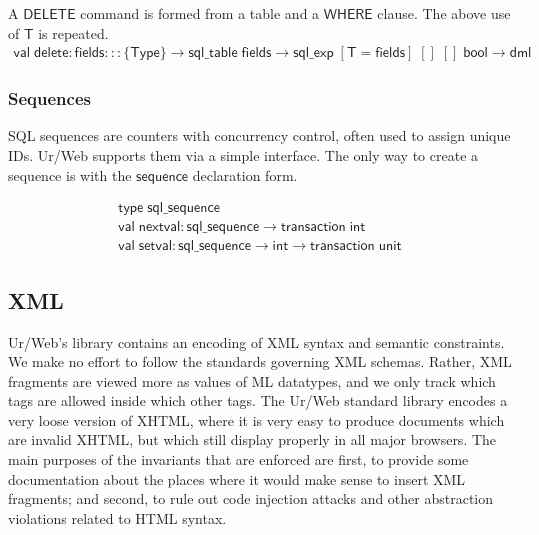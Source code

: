 \documentclass{article}
\newcommand{\mt}[1]{\mathsf{#1}}
\begin{document}
A $\mt{DELETE}$ command is formed from a table and a $\mt{WHERE}$ clause.  The above use of $\mt{T}$ is repeated.
$$\begin{array}{l}
  \mt{val} \; \mt{delete} : \mt{fields} ::: \{\mt{Type}\} \to \mt{sql\_table} \; \mt{fields} \to \mt{sql\_exp} \; [\mt{T} = \mt{fields}] \; [] \; [] \; \mt{bool} \to \mt{dml}
\end{array}$$

\subsubsection{Sequences}

SQL sequences are counters with concurrency control, often used to assign unique IDs.  Ur/Web supports them via a simple interface.  The only way to create a sequence is with the $\mt{sequence}$ declaration form.

$$\begin{array}{l}
  \mt{type} \; \mt{sql\_sequence} \\
  \mt{val} \; \mt{nextval} : \mt{sql\_sequence} \to \mt{transaction} \; \mt{int} \\
  \mt{val} \; \mt{setval} : \mt{sql\_sequence} \to \mt{int} \to \mt{transaction} \; \mt{unit}
\end{array}$$


\subsection{\label{xml}XML}

Ur/Web's library contains an encoding of XML syntax and semantic constraints.  We make no effort to follow the standards governing XML schemas.  Rather, XML fragments are viewed more as values of ML datatypes, and we only track which tags are allowed inside which other tags.  The Ur/Web standard library encodes a very loose version of XHTML, where it is very easy to produce documents which are invalid XHTML, but which still display properly in all major browsers.  The main purposes of the invariants that are enforced are first, to provide some documentation about the places where it would make sense to insert XML fragments; and second, to rule out code injection attacks and other abstraction violations related to HTML syntax.
\end{document}
